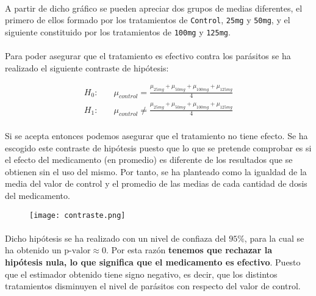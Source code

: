 \documentclass{article}
\begin{document}
      \paragraph{}

      \paragraph{}
      A partir de dicho gráfico se pueden apreciar dos grupos de medias diferentes, el primero de ellos formado por los tratamientos de \texttt{Control}, \texttt{25mg} y \texttt{50mg}, y el siguiente constituido por los tratamientos de \texttt{100mg} y \texttt{125mg}.

      \paragraph{}
      Para poder asegurar que el tratamiento es efectivo contra los parásitos se ha realizado el siguiente contraste de hipótesis:

      \begin{align*}
        H_0:& \quad \mu_{control} = \frac{\mu_{25mg} + \mu_{50mg} +\mu_{100mg} +\mu_{125mg}}{4} \\
        H_1:& \quad \mu_{control} \neq \frac{\mu_{25mg} + \mu_{50mg} +\mu_{100mg} +\mu_{125mg}}{4}
      \end{align*}

      \paragraph{}
      Si se acepta entonces podemos asegurar que el tratamiento no tiene efecto. Se ha escogido este contraste de hipótesis puesto que lo que se pretende comprobar es si el efecto del medicamento (en promedio) es diferente de los resultados que se obtienen sin el uso del mismo. Por tanto, se ha planteado como la igualdad de la media del valor de control y el promedio de las medias de cada cantidad de dosis del medicamento.


          \begin{figure}[H]
            \centering
            \texttt{[image: contraste.png]}
          \end{figure}

      \paragraph{}
      Dicho hipótesis se ha realizado con un nivel de confiaza del $95\%$, para la cual se ha obtenido un $\text{p-valor}\approx 0$. Por esta razón \textbf{tenemos que rechazar la hipótesis nula, lo que significa que el medicamento es efectivo}. Puesto que el estimador obtenido tiene signo negativo, es decir, que los distintos tratamientos disminuyen el nivel de parásitos con respecto del valor de control.
\end{document}
